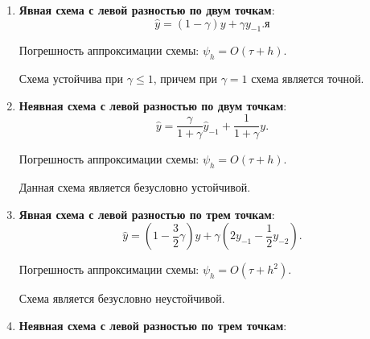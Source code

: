 \documentclass[12pt, a4paper]{article}
\begin{document}
\begin{enumerate}

	\item \textbf{Явная схема с левой разностью по двум точкам}:
	\begin{equation*}
		\widehat{y} = (1 - \gamma) y + \gamma y_{-1}.
я	\end{equation*}
	
	Погрешность аппроксимации схемы: 
	$\psi_h = O(\tau + h)$.
	
	Схема устойчива при $\gamma \leq 1 $, причем при $\gamma = 1$ схема является точной.
	
	\bigskip
	\item \textbf{Неявная схема с левой разностью по двум точкам}:
	\begin{equation*}
		\widehat{y} = \dfrac{\gamma}{1 + \gamma} \widehat{y}_{-1} + \dfrac{1}{1 + \gamma} y .
	\end{equation*}
	
	Погрешность аппроксимации схемы: $\psi_h = O(\tau + h)$.
	
	Данная схема является безусловно устойчивой.
	
	\bigskip
	\item \textbf{Явная схема с левой разностью по трем точкам}:
	\begin{equation*}
		\widehat{y} = (1 - \frac{3}{2}\gamma) y + \gamma(2y_{-1} - \frac{1}{2}y_{-2}).
	\end{equation*}
	
	Погрешность аппроксимации схемы: 
	$\psi_h = O(\tau + h^2)$.
	
	Схема является безусловно неустойчивой.
	
	\bigskip
	\item \textbf{Неявная схема с левой разностью по трем точкам}:
	
	
	
	

\end{enumerate}
\end{document}
